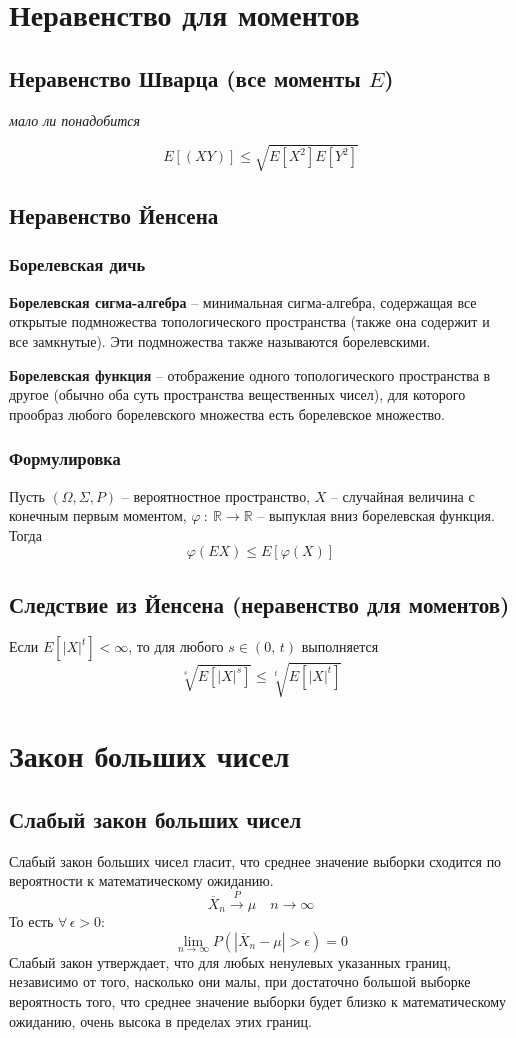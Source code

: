 \documentclass{article}
\newcommand{\R}{\mathbb{R}}
\begin{document}
\section{Неравенство для моментов}
\subsection{Неравенство Шварца (все моменты $E$)}
\textit{мало ли понадобится}

$$ E[(XY)]\leq\sqrt{E[X^2]E[Y^2]} $$
\subsection{Неравенство Йенсена}
\subsubsection{Борелевская дичь}
\textbf{Борелевская сигма-алгебра} -- минимальная сигма-алгебра, содержащая все открытые подмножества топологического пространства (также она содержит и все замкнутые). Эти подмножества также называются борелевскими.

\textbf{Борелевская функция} -- отображение одного топологического пространства в другое (обычно оба суть пространства вещественных чисел), для которого прообраз любого борелевского множества есть борелевское множество.

\subsubsection{Формулировка}
Пусть $(\Omega,\Sigma,P)$ -- вероятностное пространство, $X$ -- случайная величина с конечным первым моментом, $\varphi\::\:\R\to\R$ -- выпуклая вниз борелевская функция. Тогда
$$ \varphi(EX)\leq E[\varphi(X)] $$
\subsection{Следствие из Йенсена (неравенство для моментов)}
Если $E[|X|^t]<\infty$, то для любого $s\in(0,\,t)$ выполняется
$$ \sqrt[s]{E[|X|^s]}\leq\sqrt[t]{E[|X|^t]} $$
\newpage
\section{Закон больших чисел}
\subsection{Слабый закон больших чисел}
Слабый закон больших чисел гласит, что среднее значение выборки сходится по вероятности к математическому ожиданию.
$$ \overline{X}_n\xrightarrow{P}\mu\quad n\to\infty $$
То есть $\forall\,\epsilon>0$:
$$ \lim_{n\to\infty} P(|\overline{X}_n-\mu|>\epsilon)=0 $$
Слабый закон утверждает, что для любых ненулевых указанных границ, независимо от того, насколько они малы, при достаточно большой выборке вероятность того, что среднее значение выборки будет близко к математическому ожиданию, очень высока в пределах этих границ.
\end{document}
